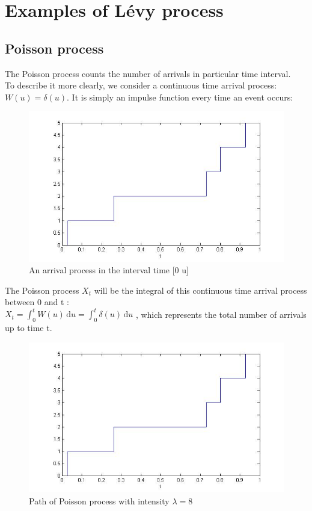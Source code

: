 \documentclass[12pt]{report}
\begin{document}
\section{Examples of Lévy process }
\subsection{Poisson process}
The Poisson process counts the number of arrivals in particular time interval.\\
To describe it more clearly, we consider a continuous time arrival process: $ W(u)=\delta(u)$. It is simply an impulse function
 every time an event occurs:
\begin{figure}[H]
\centering
\includegraphics[scale=0.7]{poisson.jpg} 
\caption{An arrival process in the interval time [0 u]}
\end{figure}

The Poisson process $X_t$ will be the integral of this continuous time arrival process between 0 and t :\\
$X_t=\displaystyle \int_{0}^{t} W(u) \, \mathrm{d}u=\displaystyle \int_{0}^{t} \delta(u) \, \mathrm{d}u$ , which represents the total number of arrivals up to  time t.\\


\begin{figure}[h]

\centering
\includegraphics[scale=0.7]{poisson.jpg} 
\caption{Path of Poisson process with intensity $\lambda = 8$}
\end{figure}
\end{document}
